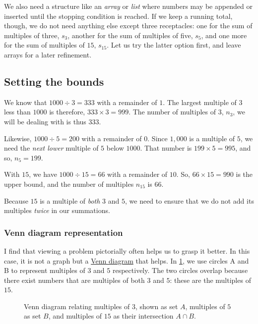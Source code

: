 \documentclass[
  a4paper,
]{article}
\begin{document}
We also need a structure like an \emph{array} or \emph{list} where
numbers may be appended or inserted until the stopping condition is
reached. If we keep a running total, though, we do not need anything
else except three receptacles: one for the sum of multiples of three,
\(s_3\), another for the sum of multiples of five, \(s_5\), and one more
for the sum of multiples of \(15\), \(s_{15}\). Let us try the latter
option first, and leave arrays for a later refinement.

\hypertarget{setting-the-bounds}{%
\subsection{Setting the bounds}\label{setting-the-bounds}}

We know that \(1000 \div 3 = 333\) with a remainder of \(1\). The
largest multiple of \(3\) less than \(1000\) is therefore,
\(333 \times 3 = 999\). The number of multiples of \(3\), \(n_{3}\), we
will be dealing with is thus \(333\).

Likewise, \(1000 \div 5 = 200\) with a remainder of \(0\). Since
\(1,000\) is a multiple of \(5\), we need the \emph{next lower} multiple
of \(5\) below \(1000\). That number is \(199 \times 5 = 995\), and so,
\(n_{5} = 199\).

With \(15\), we have \(1000 \div 15 = 66\) with a remainder of \(10\).
So, \(66 \times 15 = 990\) is the upper bound, and the number of
multiples \(n_{15}\) is \(66\).

Because \(15\) is a multiple of \emph{both} \(3\) and \(5\), we need to
ensure that we do not add its multiples \emph{twice} in our summations.

\hypertarget{venn-diagram-representation}{%
\subsubsection{Venn diagram
representation}\label{venn-diagram-representation}}

I find that viewing a problem pictorially often helps us to grasp it
better. In this case, it is not a graph but a
\href{https://www.lucidchart.com/pages/tutorial/venn-diagram}{Venn
diagram} that helps. In \cref{fig:venn}, we use circles A and B to
represent multiples of \(3\) and \(5\) respectively. The two circles
overlap because there exist numbers that are multiples of both \(3\) and
\(5\): these are the multiples of \(15\).

\begin{figure}
\hypertarget{fig:venn}{%
\centering

\caption{Venn diagram relating multiples of \(3\), shown as set \(A\),
multiples of \(5\) as set \(B\), and multiples of \(15\) as their
intersection \(A\cap B\).}\label{fig:venn}
}
\end{figure}
\end{document}
